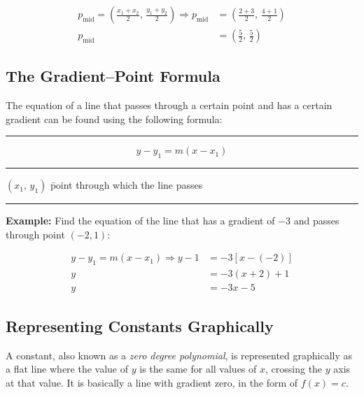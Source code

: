 \documentclass[a5paper,9pt]{book}
\theoremstyle{definition}
\newcommand{\nomlinesur}[2]{%
    \vspace*{\baselineskip}

    \hrule%

    \vspace*{\medskipamount}

    #1

    \vspace*{\medskipamount}

    \hrule%

    \vspace*{\medskipamount}
    
    #2

    \vspace*{\medskipamount}

    \hrule

    \vspace*{\baselineskip}
}
\newcommand{\Rarr}{\Rightarrow}
\begin{document}
        \begin{align*}
            p_\mathrm{mid} = \left(\frac{x_1+x_2}{2},\,\frac{y_1+y_2}{2}\right) \Rarr p_\mathrm{mid} &= \left(\frac{2+3}{2},\,\frac{4+1}{2}\right) \\[5pt]
            p_\mathrm{mid} &= \left(\frac{5}{2},\,\frac{5}{2}\right)
        \end{align*}

        \pagebreak

        \subsection{The Gradient--Point Formula}

        The equation of a line that passes through a certain point and has a certain
        gradient can be found using the following formula:

        \nomlinesur{%
            \begin{equation}
                y-y_1 = m(x-x_1)
                \label{eq:point_slope_formula}
            \end{equation}
        }{%
            \begin{tabbing}
                $(x_1,\,y_1)$ \hspace{30pt}\= point through which the line passes
            \end{tabbing}
        }

        \noindent\textbf{Example:}\; Find the equation of the line that has a gradient of $-3$
        and passes through point $(-2,1)$:

        \begin{align*}
            y-y_1=m(x-x_1) \Rarr y-1 &= -3[x-(-2)] \\
            y &= -3(x+2) +1 \\
            y &= -3x - 5
        \end{align*}

        \subsection{Representing Constants Graphically}

        A constant, also known as a \emph{zero degree polynomial}, is represented graphically as a flat line where the value of $y$ is
        the same for all values of $x$, crossing the $y$ axis at that value. It is basically
        a line with gradient zero, in the form of $f(x)=c$.
\end{document}
